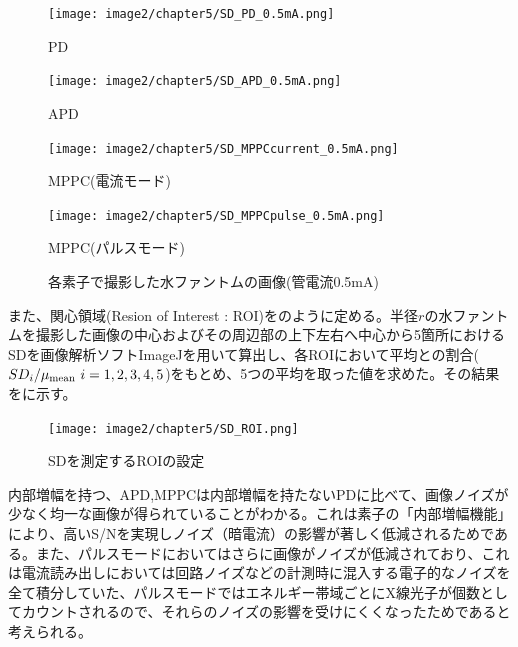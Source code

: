 \begin{figure}[H]
 \begin{minipage}{0.5\hsize}
  \begin{center}
   \texttt{[image: image2/chapter5/SD\_PD\_0.5mA.png]} 
  \end{center}
  \vspace{-1cm}
  \caption*{PD}
 \end{minipage}
 \begin{minipage}{0.5\hsize}
  \begin{center}
 \texttt{[image: image2/chapter5/SD\_APD\_0.5mA.png]} 
  \end{center}
  \vspace{-1cm}
  \caption*{APD}
 \end{minipage}
  \begin{minipage}{0.5\hsize}
  \begin{center}
 \texttt{[image: image2/chapter5/SD\_MPPCcurrent\_0.5mA.png]} 
  \end{center}
  \vspace{-1cm}
  \caption*{MPPC(電流モード)}
 \end{minipage}
  \begin{minipage}{0.5\hsize}
  \begin{center}
 \texttt{[image: image2/chapter5/SD\_MPPCpulse\_0.5mA.png]} 
  \end{center}
  \vspace{-1cm}
  \caption*{MPPC(パルスモード)}
 \end{minipage}
 \begin{center}
  \caption{各素子で撮影した水ファントムの画像(管電流0.5mA)}
  \label{fig:SD_result}
  \end{center}
\end{figure}

また、関心領域(Resion of Interest : ROI)をのように定める。半径$r$の水ファントムを撮影した画像の中心およびその周辺部の上下左右へ中心から5箇所におけるSDを画像解析ソフトImageJを用いて算出し、各ROIにおいて平均との割合($SD_i/\mu_{\rm mean}\ i=1,2,3,4,5$)をもとめ、5つの平均を取った値を求めた。その結果をに示す。

\begin{figure}[H]
 \begin{center}
 \texttt{[image: image2/chapter5/SD\_ROI.png]} 
 \end{center}
 \caption{SDを測定するROIの設定}
 \label{fig:SD_ROI}
\end{figure}

内部増幅を持つ、APD,MPPCは内部増幅を持たないPDに比べて、画像ノイズが少なく均一な画像が得られていることがわかる。これは素子の「内部増幅機能」により、高いS/Nを実現しノイズ（暗電流）の影響が著しく低減されるためである。また、パルスモードにおいてはさらに画像がノイズが低減されており、これは電流読み出しにおいては回路ノイズなどの計測時に混入する電子的なノイズを全て積分していた、パルスモードではエネルギー帯域ごとにX線光子が個数としてカウントされるので、それらのノイズの影響を受けにくくなったためであると考えられる。



